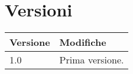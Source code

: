 \chapter{Versioni}
\begin{center}
\begin{tabular}{| m{8em} | m{8cm}|}
    \hline
    Versione & Modifiche \\
    \hline
    1.0 & Prima versione. \\
    \hline
\end{tabular}
\end{center}